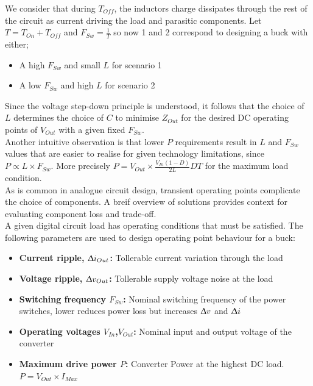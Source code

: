 \documentclass[letterpaper,twocolumn,10pt]{article}
\begin{document}
We consider that during $T_{Off}$, the inductors charge dissipates through the rest of the circuit as current driving the load and parasitic components. Let $T = T_{On}+T_{Off}$ and $F_{Sw} = \frac{1}{T}$ so now 1 and 2 correspond to designing a buck with either;\\
\begin{itemize} %
\item{A high $F_{Sw}$ and small $L$ for scenario 1}
\item{A low $F_{Sw}$ and high $L$ for scenario 2}
\end{itemize}
Since the voltage step-down principle is understood, it follows that the choice of $L$ determines the choice of $C$ to minimise $Z_{Out}$ for the desired DC operating points of $V_{Out}$ with a given fixed $F_{Sw}$.\\
Another intuitive observation is that lower $P$ requirements result in $L$ and $F_{Sw}$ values that are easier to realise for given technology limitations, since $P \propto L\times F_{Sw}$. More precisely $P = V_{Out}\times \frac{V_{In}(1 - D)}{2L}DT$ for the maximum load condition.\\ %
\indent As is common in analogue circuit design, transient operating points complicate the choice of components. A breif overview of solutions provides context for evaluating component loss and trade-off.\\ %
A given digital circuit load has operating conditions that must be satisfied. The following parameters are used to design operating point behaviour for a buck: %
\begin{itemize}
\item {\textbf{Current ripple, $\Updelta i_{Out}$: }Tollerable current variation through the load}
\item {\textbf{Voltage ripple, $\Updelta v_{Out}$: }Tollerable supply voltage noise at the load}
\item {\textbf{Switching frequency $F_{Sw}$: }Nominal switching frequency of the power switches, lower reduces power loss but increases $\Updelta v$ and $\Updelta i$}
\item {\textbf{Operating voltages $V_{In}$,$V_{Out}$: }Nominal input and output voltage of the converter}
\item {\textbf{Maximum drive power $P$: }Converter Power at the highest DC load. $P = V_{Out}\times I_{Max}$} 
\end{itemize}   
\end{document}
